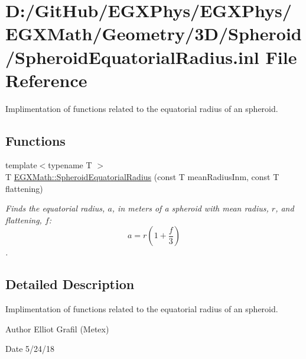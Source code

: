 \hypertarget{_spheroid_equatorial_radius_8inl}{}\section{D\+:/\+Git\+Hub/\+E\+G\+X\+Phys/\+E\+G\+X\+Phys/\+E\+G\+X\+Math/\+Geometry/3\+D/\+Spheroid/\+Spheroid\+Equatorial\+Radius.inl File Reference}
\label{_spheroid_equatorial_radius_8inl}


Implimentation of functions related to the equatorial radius of an spheroid.  


\subsection*{Functions}
\begin{DoxyCompactItemize}
\item 
{\footnotesize template$<$typename T $>$ }\\T \mbox{\hyperlink{group___e_g_x_math-_geometry-3_d-_spheroid-_equatorial_radius_ga1cbe564fee1b509c622d1c6d276158cd}{E\+G\+X\+Math\+::\+Spheroid\+Equatorial\+Radius}} (const T mean\+Radius\+Inm, const T flattening)
\begin{DoxyCompactList}\small\item\em Finds the equatorial radius, $a$, in meters of a spheroid with mean radius, $r$, and flattening, $f$\+: \[ a = r \left (1 + \dfrac{f}{3} \right ) \]. \end{DoxyCompactList}\end{DoxyCompactItemize}


\subsection{Detailed Description}
Implimentation of functions related to the equatorial radius of an spheroid. 

\begin{DoxyAuthor}{Author}
Elliot Grafil (Metex) 
\end{DoxyAuthor}
\begin{DoxyDate}{Date}
5/24/18 
\end{DoxyDate}
